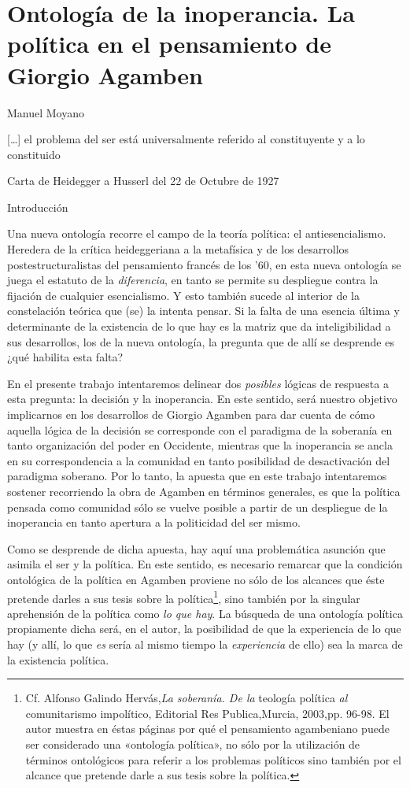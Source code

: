 \chapter{Ontología de la inoperancia. La política en el pensamiento de Giorgio Agamben}

Manuel Moyano

{[}\ldots{]} el problema del ser está universalmente referido al constituyente y a lo constituido

Carta de Heidegger a Husserl del 22 de Octubre de 1927

{Introducción}


Una nueva ontología recorre el campo de la teoría política: el antiesencialismo. Heredera de la crítica heideggeriana a la metafísica y de los desarrollos postestructuralistas del pensamiento francés de los '60, en esta nueva ontología se juega el estatuto de la \emph{diferencia}, en tanto se permite su despliegue contra la fijación de cualquier esencialismo. Y esto también sucede al interior de la constelación teórica que (se) la intenta pensar. Si la falta de una esencia última y determinante de la existencia de lo que hay es la matriz que da inteligibilidad a sus desarrollos, los de la nueva ontología, la pregunta que de allí se desprende es ¿qué habilita esta falta?

En el presente trabajo intentaremos delinear dos \emph{posibles} lógicas de respuesta a esta pregunta: la decisión y la inoperancia. En este sentido, será nuestro objetivo implicarnos en los desarrollos de Giorgio Agamben para dar cuenta de cómo aquella lógica de la decisión se corresponde con el paradigma de la soberanía en tanto organización del poder en Occidente, mientras que la inoperancia se ancla en su correspondencia a la comunidad en tanto posibilidad de desactivación del paradigma soberano. Por lo tanto, la apuesta que en este trabajo intentaremos sostener recorriendo la obra de Agamben en términos generales, es que la política pensada como comunidad sólo se vuelve posible a partir de un despliegue de la inoperancia en tanto apertura a la politicidad del ser mismo.

Como se desprende de dicha apuesta, hay aquí una problemática asunción que asimila el ser y la política. En este sentido, es necesario remarcar que la condición ontológica de la política en Agamben proviene no sólo de los alcances que éste pretende darles a sus tesis sobre la política\footnote{Cf. Alfonso Galindo Hervás,\emph{La soberanía. De la} teología política \emph{al} comunitarismo impolítico, Editorial Res Publica,Murcia, 2003,pp. 96-98. El autor muestra en éstas páginas por qué el pensamiento agambeniano puede ser considerado una «ontología política», no sólo por la utilización de términos ontológicos para referir a los problemas políticos sino también por el alcance que pretende darle a sus tesis sobre la política.}, sino también por la singular aprehensión de la política como \emph{lo que hay}. La búsqueda de una ontología política propiamente dicha será, en el autor, la posibilidad de que la experiencia de lo que hay (y allí, lo que \emph{es} sería al mismo tiempo la \emph{experiencia} de ello) sea la marca de la existencia política.


